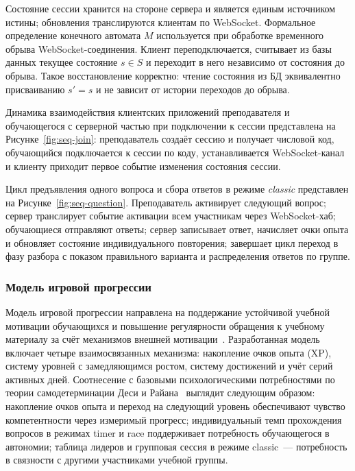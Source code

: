 Состояние сессии хранится на стороне сервера и является единым
источником истины; обновления транслируются клиентам по WebSocket.
Формальное определение конечного автомата $M$ используется при
обработке временного обрыва WebSocket-соединения. Клиент
переподключается, считывает из базы данных текущее состояние
$s \in S$ и переходит в него независимо от состояния до обрыва.
Такое восстановление корректно: чтение состояния из БД эквивалентно
присваиванию $s' = s$ и не зависит от истории переходов
до обрыва.


Динамика взаимодействия клиентских приложений преподавателя
и обучающегося с серверной частью при подключении к сессии
представлена на Рисунке~\ref{fig:seq-join}: преподаватель создаёт
сессию и получает числовой код, обучающийся подключается к сессии
по коду, устанавливается WebSocket-канал и клиенту приходит первое
событие изменения состояния сессии.


Цикл предъявления одного вопроса и сбора ответов в режиме
\emph{classic} представлен на Рисунке~\ref{fig:seq-question}.
Преподаватель активирует следующий вопрос; сервер транслирует
событие активации всем участникам через WebSocket-хаб; обучающиеся
отправляют ответы; сервер записывает ответ, начисляет очки опыта
и обновляет состояние индивидуального повторения; завершает цикл
переход в фазу разбора с показом правильного варианта
и распределения ответов по группе.


\subsubsection{Модель игровой прогрессии}

Модель игровой прогрессии направлена на поддержание устойчивой
учебной мотивации обучающихся и повышение регулярности обращения
к учебному материалу за счёт механизмов внешней
мотивации~\cite{deterding2011,sailer2020}. Разработанная модель
включает четыре взаимосвязанных механизма: накопление очков опыта
(XP), систему уровней с замедляющимся ростом, систему достижений
и учёт серий активных дней. Соотнесение
с базовыми психологическими потребностями по теории
самодетерминации Деси и Райана~\cite{deci_ryan_2000} выглядит
следующим образом: накопление очков опыта и переход на следующий
уровень обеспечивают чувство компетентности через измеримый
прогресс; индивидуальный темп прохождения вопросов в режимах
timer и race поддерживает потребность обучающегося в автономии;
таблица лидеров и групповая сессия в режиме classic~--- потребность
в связности с другими участниками учебной группы.

